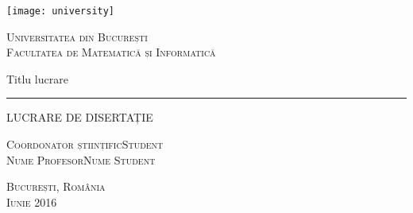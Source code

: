 \begin{titlepage}
	\begin{center}

		\texttt{[image: university]}

		\vspace{0.5cm}
		\LARGE \textsc{Universitatea din București}
		\\
		\vspace{0.5cm}
		\Large \textsc{Facultatea de Matematică și Informatică}

		\vfill

		\Huge Titlu lucrare
		\rule{\textwidth}{1pt}
		\Large LUCRARE DE DISERTAȚIE

		\vfill

		\Large
		\textsc{Coordonator științific}\hfill \textsc{Student}
		\\
		\large
		\textsc{Nume Profesor}\hfill \textsc{Nume Student}
	
		\vspace{1.5cm}
		\textsc{București, România}\\
		\textsc{Iunie 2016}

	\end{center}
\end{titlepage}
 
